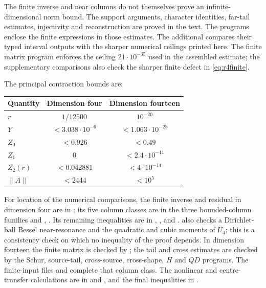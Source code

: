 \documentclass[11pt]{amsart}
\theoremstyle{remark}
\numberwithin{equation}{section}
\newcommand{\norm}[1]{\lVert#1\rVert}
\begin{document}
The finite inverse and near columns do not themselves prove an
infinite-dimensional norm bound. The support arguments,
character identities, far-tail estimates, injectivity and
reconstruction are proved in the text. The programs enclose the
finite expressions in those estimates. The additional
 compares their typed interval outputs
with the sharper numerical ceilings printed here. The finite matrix program enforces the ceiling $21\cdot10^{-35}$ used in the assembled estimate; the supplementary comparisons also
check the sharper finite defect in \eqref{eq:r4finite}.

The principal contraction bounds are:
\begin{center}
\begin{tabular}{@{}lcc@{}}
\toprule
Quantity & Dimension four & Dimension fourteen\\
\midrule
$r$ & $1/12500$ & $10^{-20}$\\
$Y$ & $<3.038\cdot10^{-6}$ & $<1.063\cdot10^{-25}$\\
$Z_0$ & $<0.926$ & $<0.49$\\
$Z_1$ & $0$ & $<2.4\cdot10^{-11}$\\
$Z_2(r)$ & $<0.042881$ & $<4\cdot10^{-14}$\\
$\norm A$ & $<2444$ & $<10^5$\\
\bottomrule
\end{tabular}
\end{center}

For location of the numerical comparisons, the finite inverse and
residual in dimension four are in
; its five column classes are in the
three bounded-column families and
,
. Its remaining inequalities are in
, ,
 and .
 also checks a Dirichlet-ball Bessel near-resonance and the quadratic and cubic moments of $U_4$; this is a consistency check on which no inequality of the proof depends.
In dimension fourteen the finite matrix is checked by
; the tail and cross estimates are
checked by the Schur, source-tail, cross-source, cross-shape, $H$ and
$QD$ programs. The finite-input files and
 complete that column class.
The nonlinear and centre-transfer calculations are in
 and
, and the final inequalities in
.
\end{document}

